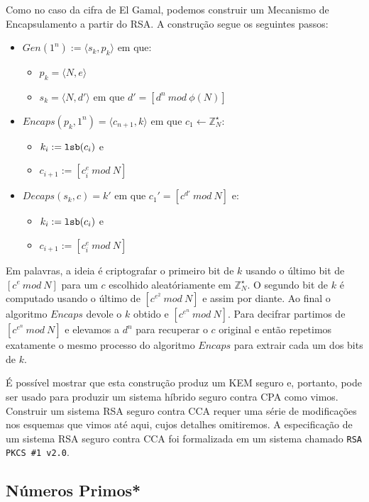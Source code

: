 Como no caso da cifra de El Gamal, podemos construir um Mecanismo de Encapsulamento a partir do RSA.
A construção segue os seguintes passos:
\begin{itemize}
\item $Gen(1^n) := \langle s_k, p_k \rangle$ em que:
\begin{itemize}
\item $p_k = \langle N, e \rangle$
\item $s_k = \langle N, d' \rangle$ em que $d' = [d^n\ mod\ \phi(N)]$
\end{itemize}
\item $Encaps(p_k, 1^n) = \langle c_{n+1}, k \rangle$ em que $c_1 \leftarrow \mathbb{Z}_N^\star$:
\begin{itemize}
\item $k_i := \textrm{\tt lsb}(c_i)$ e
\item $c_{i+1} := [c_i^e\ mod\ N]$
\end{itemize}
\item $Decaps(s_k, c) = k'$ em que $c_1' = [c^{d'}\ mod\ N]$ e:
\begin{itemize}
\item $k_i := \textrm{\tt lsb}(c_i)$ e
\item $c_{i+1} := [c_i^e\ mod\ N]$
\end{itemize}
\end{itemize}

Em palavras, a ideia é criptografar o primeiro bit de $k$ usando o último bit de $[c^e\ mod\ N]$ para um $c$ escolhido aleatóriamente em $\mathbb{Z}_N^\star$.
O segundo bit de $k$ é computado usando o último de $[c^{e^2}\ mod\ N]$ e assim por diante.
Ao final o algoritmo $Encaps$ devole o $k$ obtido e $[c^{e^n}\ mod\ N]$.
Para decifrar partimos de $[c^{e^n}\ mod\ N]$ e elevamos a $d^n$ para recuperar o $c$ original e então repetimos exatamente o mesmo processo do algoritmo $Encaps$ para extrair cada um dos bits de $k$.

É possível mostrar que esta construção produz um KEM seguro e, portanto, pode ser usado para produzir um sistema híbrido seguro contra CPA como vimos.
Construir um sistema RSA seguro contra CCA requer uma série de modificações nos esquemas que vimos até aqui, cujos detalhes omitiremos.
A especificação de um sistema RSA seguro contra CCA foi formalizada em um sistema chamado {\tt RSA PKCS \#1 v2.0}.


\subsection{Números Primos*}
\label{sec:primos}

